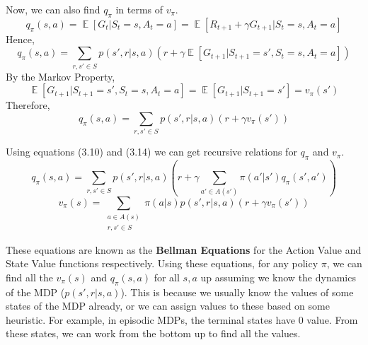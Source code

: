 \documentclass[12pt]{report}
\begin{document}
Now, we can also find $q_{\pi}$ in terms of $v_{\pi}$.
\begin{equation}
    q_{\pi}(s, a) = \mathop{\mathbb{E}}\left[G_{t} | S_{t} = s, A_{t} = a\right] = \mathop{\mathbb{E}}\left[R_{t + 1} + \gamma G_{t + 1} | S_{t} = s, A_{t} = a\right]
\end{equation} 
Hence,
\begin{equation}
    q_{\pi}(s, a) = \sum\limits_{r, s' \in S} p(s', r | s, a)(r + \gamma \mathop{\mathbb{E}}\left[G_{t + 1} | S_{t + 1} = s', S_{t} = s, A_{t} = a\right])
\end{equation}
By the Markov Property, 
\begin{equation}
    \mathop{\mathbb{E}}\left[G_{t + 1} | S_{t + 1} = s', S_{t} = s, A_{t} = a\right] = \mathop{\mathbb{E}}\left[G_{t + 1} | S_{t + 1} = s'\right] = v_{\pi}(s')
\end{equation}
Therefore,
\begin{equation}
    q_{\pi}(s, a) = \sum\limits_{r, s' \in S} p(s', r | s, a)(r + \gamma v_{\pi}(s'))
\end{equation}

Using equations (3.10) and (3.14) we can get recursive relations for $q_{\pi}$ and $v_{\pi}$.
\begin{equation}
    q_{\pi}(s, a) = \sum\limits_{r, s' \in S} p(s', r | s, a)(r + \gamma\sum\limits_{a' \in A(s')}\pi(a' | s') q_{\pi}(s', a'))
\end{equation}
\begin{equation}
    v_{\pi}(s) = \sum\limits_{\substack{a \in A(s)\\r, s' \in S}} \pi(a | s) p(s', r | s, a)(r + \gamma v_{\pi}(s'))
\end{equation}

These equations are known as the \textbf{Bellman Equations} for the Action Value and State Value functions respectively. Using these equations, for any policy $\pi$, we can find all the $v_{\pi}(s)$ and 
$q_{\pi}(s, a)$ for all $s, a$ up assuming we know the dynamics of the MDP ($p(s', r | s, a)$). This is because we usually know the values of some states of the MDP already, or we can assign values to these 
based on some heuristic. For example, in episodic MDPs, the terminal states have $0$ value. From these states, we can work from the bottom up to find all the values.
\end{document}

